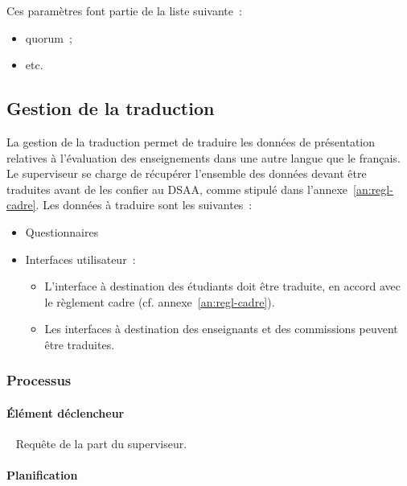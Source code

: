 \documentclass[a4paper,11pt]{report}
\begin{document}
\noindent Ces paramètres font partie de la liste suivante~:
\begin{itemize}
	\item quorum~;
	\item etc.
\end{itemize}





\subsection{Gestion de la traduction}
La gestion de la traduction permet de traduire les données de présentation relatives à l'évaluation des enseignements dans une autre langue que le français.
Le superviseur se charge de récupérer l'ensemble des données devant être traduites avant de les confier au DSAA, comme stipulé dans l'annexe~\ref{an:regl-cadre}.
Les données à traduire sont les suivantes~:
\begin{itemize}
	\item Questionnaires
	\item Interfaces utilisateur~:
	\begin{itemize}
		\item L'interface à destination des étudiants doit être traduite, en accord avec le règlement cadre (cf. annexe~\ref{an:regl-cadre}).
		\item Les interfaces à destination des enseignants et des commissions peuvent être traduites.
	\end{itemize}
\end{itemize}

\subsubsection{Processus}
\paragraph{Élément déclencheur}~\newline{}
Requête de la part du superviseur.

\paragraph{Planification}~\newline{}
\end{document}
